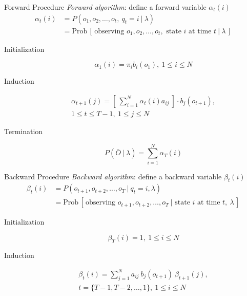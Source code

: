 \documentclass[10pt]{beamer}
\begin{document}
\begin{frame}{Forward Procedure}
  \textit{Forward algorithm}: define a forward variable $\alpha_t(i)$
  \begin{align}
    \alpha_t (i)
     & = P(o_1, o_2, \dots, o_t,\ q_t = i\ |\ \lambda)                                                              \\
     & = \text{Prob}\,[\,\text{observing } o_1, o_2, \dots, o_t, \text{ state } i \text{ at time } t\ |\ \lambda\,]
  \end{align}

  \begin{description}
    \item[Initialization]
          \begin{equation}
            \alpha_1(i) = \pi_i b_i (o_1),\ 1 \leq i \leq N
          \end{equation}
    \item[Induction]
          \begin{multline}
            \alpha_{t+1}(j) = \left[\ \sum_{i=1}^{N} \alpha_t(i) a_{i j}\ \right] \cdot b_j(o_{t+1}),\\
            1 \leq t \leq T-1,\ 1 \leq j \leq N
          \end{multline}
    \item[Termination]
          \begin{equation}
            P\left( \bar{O}\ |\ \lambda \right) = \sum_{i=1}^{N} \alpha_T(i)
          \end{equation}
  \end{description}
\end{frame}

\begin{frame}{Backward Procedure}
  \textit{Backward algorithm}: define a backward variable $\beta_t(i)$
  \begin{align}
    \beta_t(i)
     & = P(o_{t+1}, o_{t+2}, \dots, o_T\ |\ q_t = i, \lambda)                                                               \\
     & = \text{Prob}\,[\,\text{observing } o_{t+1}, o_{t+2}, \dots, o_T\ | \text{ state } i \text{ at time } t,\ \lambda\,]
  \end{align}

  \begin{description}
    \item[Initialization]
          \begin{equation}
            \beta_T(i) = 1,\ 1 \leq i \leq N
          \end{equation}
    \item[Induction]
          \begin{multline}
            \beta_{t}(i) = \sum_{j=1}^{N} a_{i j}\ b_j (o_{t+1})\  \beta_{t+1}(j),\\
            t = \{ T-1, T-2, \dots, 1\},\ 1 \leq i \leq N
          \end{multline}
  \end{description}
\end{frame}
\end{document}
